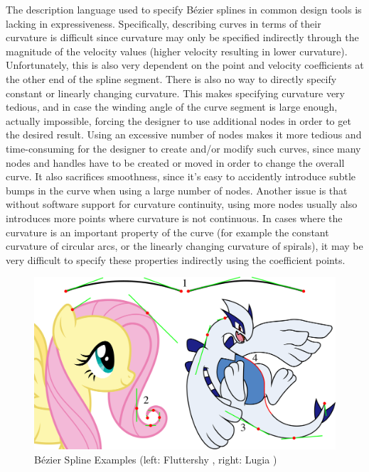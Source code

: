\documentclass[a4paper]{article}
\begin{document}
				The description language used to specify Bézier splines in common design tools is lacking in expressiveness. Specifically, describing curves in terms of their curvature is difficult since curvature may only be specified indirectly through the magnitude of the velocity values (higher velocity resulting in lower curvature). Unfortunately, this is also very dependent on the point and velocity coefficients at the other end of the spline segment. There is also no way to directly specify constant or linearly changing curvature. This makes specifying curvature very tedious, and in case the winding angle of the curve segment is large enough, actually impossible, forcing the designer to use additional nodes in order to get the desired result. Using an excessive number of nodes makes it more tedious and time-consuming for the designer to create and/or modify such curves, since many nodes and handles have to be created or moved in order to change the overall curve. It also sacrifices smoothness, since it's easy to accidently introduce subtle bumps in the curve when using a large number of nodes. Another issue is that without software support for curvature continuity, using more nodes usually also introduces more points where curvature is not continuous. In cases where the curvature is an important property of the curve (for example the constant curvature of circular arcs, or the linearly changing curvature of spirals), it may be very difficult to specify these properties indirectly using the coefficient points.

				\begin{figure}[htbp]
					\centering
					\includegraphics[width=\textwidth]{../resources/examples_bezier.pdf}
					\caption{Bézier Spline Examples (left: Fluttershy \cite{fluttershy}, right: Lugia \cite{lugia})}
					\label{figure:examples_bézier}
				\end{figure}
\end{document}
